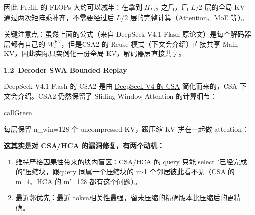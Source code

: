 \documentclass[zihao=false,fontset=windows]{ctexart}
\newcommand{\incode}[1]{\colorbox{inlinebg}{\ttfamily\small #1}}
\begin{document}
因此 Prefill 的 FLOPs 大约可以减半：在拿到 $H_{L/2}$ 之后，后 $L/2$ 层的全局 KV 通过两次矩阵乘补齐，不需要经过后 $L/2$ 层的完整计算（Attention、MoE 等）。\par

\begin{feishuquote}

关键注意点：虽然上面的公式（来自 DeepSeek V4.1 Flash 原论文）是每个解码器层都有自己的 $W_l^{KV}$，但是CSA2 的 Reuse 模式（下文会介绍）直接共享 Main KV，因此实际只实例化一份全局 KV，解码器层直接共享。\par
\end{feishuquote}

\par{}\vspace{0.8em}\noindent \begin{tcolorbox}[boxrule=0pt,arc=3pt,colback=callOrange,left=3pt,right=3pt,top=2pt,bottom=2pt,before skip=0pt,after skip=0pt]{\bfseries \textcolor{feishuBlue}{1.2}\ Decoder SWA Bounded Replay}\end{tcolorbox}\par\vspace{0.28em}

DeepSeek-V4.1-Flash 的 CSA2 是由 \href{https://my.feishu.cn/wiki/UsuawakRYiqacxkD9vxcKzylnoe}{DeepSeek V4 的 CSA} 简化而来的，CSA 下文会介绍。CSA2 仍然保留了 Sliding Window Attention 的计算细节：\par

\begin{feishubox}{callGreen}{📌}

每层保留 \incode{n\_win=128} 个 uncompressed KV，跟压缩 KV 拼在一起做 attention：\par

\textbf{这其实是对 CSA/HCA 的漏洞修复，有两个动机：}\par
\begin{enumerate}
\item 
维持严格因果性带来的块内盲区：CSA/HCA 的 query 只能 select "已经完成的"压缩块，跟query 同属一个压缩块的 m-1 个邻居彼此看不见（CSA 的 m=4、HCA 的 m'=128 都有这个问题）。\par
\item 
最近邻优先：最近 token相关性最强，留未压缩的精确版本比压缩后的更精确。\par
\end{enumerate}
\end{feishubox}
\end{document}
